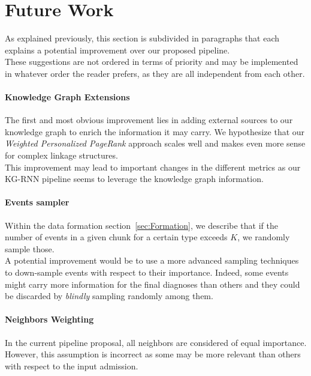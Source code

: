 \newpage
\section{Future Work}
\label{sec:Future Work}
As explained previously, this section is subdivided in paragraphs that each explains a potential improvement over our proposed pipeline. \\

These suggestions are not ordered in terms of priority and may be implemented in whatever order the reader prefers, as they are all independent from each other.

\paragraph{Knowledge Graph Extensions}
The first and most obvious improvement lies in adding external sources to our knowledge graph to enrich the information it may carry. We hypothesize that our \textit{Weighted Personalized PageRank} approach scales well and makes even more sense for complex linkage structures. \\

This improvement may lead to important changes in the different metrics as our KG-RNN pipeline seems to leverage the knowledge graph information.

\paragraph{Events sampler}
Within the data formation section~\ref{sec:Formation}, we describe that if the number of events in a given chunk for a certain type exceeds $K$, we randomly sample those. \\

A potential improvement would be to use a more advanced sampling techniques to down-sample events with respect to their importance. Indeed, some events might carry more information for the final diagnoses than others and they could be discarded by \textit{blindly} sampling randomly among them.

\paragraph{Neighbors Weighting}
In the current pipeline proposal, all neighbors are considered of equal importance. However, this assumption is incorrect as some may be more relevant than others with respect to the input admission. \\

